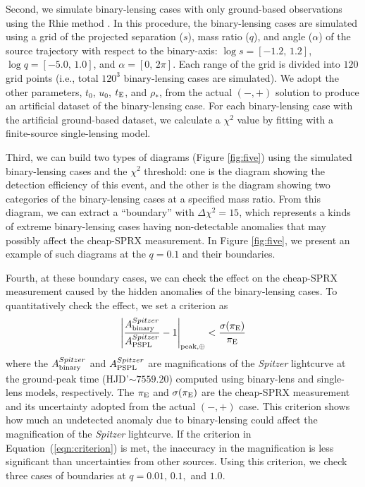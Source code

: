 \documentclass[10pt]{emulateapj}
\begin{document}
 Second, we simulate binary-lensing cases with only ground-based observations 
using the Rhie method \citep{bennett96, rhie00}. In this procedure, 
the binary-lensing cases are simulated using a grid of the projected separation 
($s$), mass ratio ($q$), and angle ($\alpha$) of the source trajectory with 
respect to the binary-axis: $\log{s}=[-1.2,\, 1.2]$, $\log{q}=[-5.0,\, 1.0]$, 
and $\alpha=[0,\, 2\pi]$. Each range of the grid is divided into $120$ grid points (i.e., 
total $120^{3}$ binary-lensing cases are simulated). We adopt the other parameters, 
$t_0$, $u_0$, $t_{\rm E}$, and $\rho_{\ast}$, from the actual $(-,+)$ solution to 
produce an artificial dataset of the binary-lensing case. For each binary-lensing 
case with the artificial ground-based dataset, we calculate a $\chi^2$ value by 
fitting with a finite-source single-lensing model. 

 Third, we can build two types of diagrams (Figure \ref{fig:five}) using the simulated 
binary-lensing cases and the $\chi^2$ threshold: one is the diagram showing the detection 
efficiency of this event, and the other is the diagram showing two categories of 
the binary-lensing cases at a specified mass ratio. From this diagram, we can extract 
a ``boundary'' with $\Delta\chi^2=15$, which represents a kinds of extreme binary-lensing cases having 
non-detectable anomalies that may possibly affect the cheap-SPRX measurement. 
In Figure \ref{fig:five}, we present an example of such diagrams at the $q=0.1$ and their boundaries.

 Fourth, at these boundary cases, we can check the effect on the cheap-SPRX measurement caused 
by the hidden anomalies of the binary-lensing cases. To quantitatively check the effect, we set 
a criterion as
\begin{equation}
\left|\frac{A_{\rm binary}^{Spitzer}}{A_{\rm PSPL}^{Spitzer}} -1 \right|_{\rm peak,\oplus} < 
\frac{\sigma(\pi_{\rm E})}{\pi_{\rm E}}
\label{eqn:criterion}
\end{equation}
where the $A_{\rm binary}^{Spitzer}$ and $A_{\rm PSPL}^{Spitzer}$ are magnifications of the {\it Spitzer} lightcurve 
at the ground-peak time (HJD'$\sim7559.20$) computed using binary-lens and single-lens models, 
respectively. The $\pi_{\rm E}$ and $\sigma(\pi_{\rm E})$ are the cheap-SPRX measurement and its 
uncertainty adopted from the actual $(-,+)$ case. 
This criterion shows how much an undetected anomaly due to binary-lensing could affect the 
magnification of the {\it Spitzer} lightcurve. If the criterion in Equation~(\ref{eqn:criterion}) 
is met, the inaccuracy in the magnification is less significant than uncertainties from other 
sources. Using this criterion, we check three cases of boundaries at $q=0.01,\,0.1,$ and $1.0$.
\end{document}
